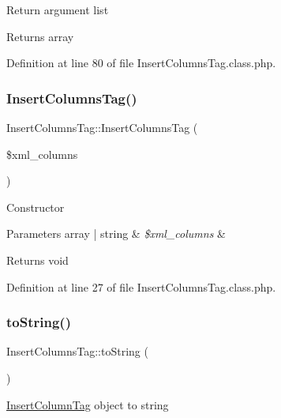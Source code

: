 Return argument list

\begin{DoxyReturn}{Returns}
array 
\end{DoxyReturn}


Definition at line 80 of file Insert\+Columns\+Tag.\+class.\+php.

\mbox{\label{classInsertColumnsTag_a4d414adeb3714b646e7a55fc6b446c2c}} 
\subsubsection{\texorpdfstring{Insert\+Columns\+Tag()}{InsertColumnsTag()}}
{\footnotesize\ttfamily Insert\+Columns\+Tag\+::\+Insert\+Columns\+Tag (\begin{DoxyParamCaption}\item[{}]{\$xml\+\_\+columns }\end{DoxyParamCaption})}

Constructor


\begin{DoxyParams}[1]{Parameters}
array | string & {\em \$xml\+\_\+columns} & \\
\hline
\end{DoxyParams}
\begin{DoxyReturn}{Returns}
void 
\end{DoxyReturn}


Definition at line 27 of file Insert\+Columns\+Tag.\+class.\+php.

\mbox{\label{classInsertColumnsTag_aa18eef08112bb20ab2d77b26270e40ea}} 
\subsubsection{\texorpdfstring{to\+String()}{toString()}}
{\footnotesize\ttfamily Insert\+Columns\+Tag\+::to\+String (\begin{DoxyParamCaption}{ }\end{DoxyParamCaption})}

\hyperlink{classInsertColumnTag}{Insert\+Column\+Tag} object to string

